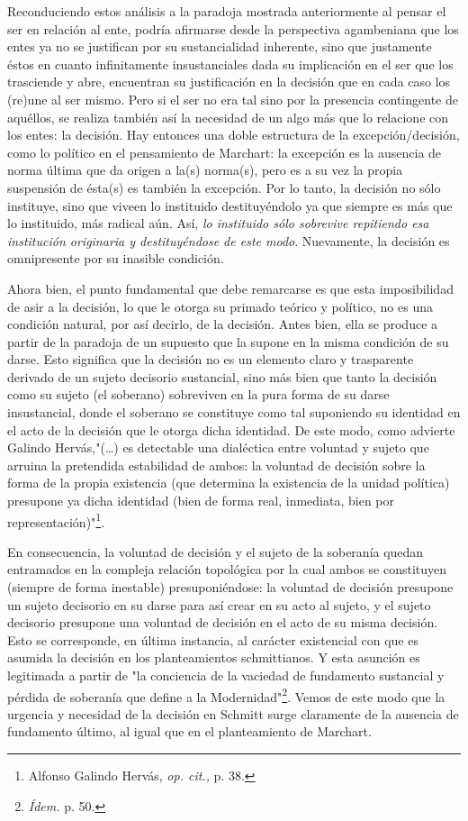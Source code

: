 \documentclass{book}
\begin{document}
Reconduciendo estos análisis a la paradoja mostrada anteriormente al
pensar el ser en relación al ente, podría afirmarse desde la perspectiva
agambeniana que los entes ya no se justifican por su sustancialidad
inherente, sino que justamente éstos en cuanto infinitamente
insustanciales dada su implicación en el ser que los trasciende y abre,
encuentran su justificación en la decisión que en cada caso los (re)une
al ser mismo. Pero si el ser no era tal sino por la presencia
contingente de aquéllos, se realiza también así la necesidad de un algo
más que lo relacione con los entes: la decisión. Hay entonces una doble
estructura de la excepción/decisión, como lo político en el pensamiento
de Marchart: la excepción es la ausencia de norma última que da origen a
la(s) norma(s), pero es a su vez la propia suspensión de ésta(s) es
también la excepción. Por lo tanto, la decisión no sólo instituye, sino
que viveen lo instituido destituyéndolo ya que siempre es más que lo
instituido, más radical aún. Así, \emph{lo instituido sólo sobrevive
repitiendo esa institución originaria y destituyéndose de este modo}.
Nuevamente, la decisión es omnipresente por su inasible condición.

Ahora bien, el punto fundamental que debe remarcarse es que esta
imposibilidad de asir a la decisión, lo que le otorga su primado teórico
y político, no es una condición natural, por así decirlo, de la
decisión. Antes bien, ella se produce a partir de la paradoja de un
supuesto que la supone en la misma condición de su darse. Esto significa
que la decisión no es un elemento claro y trasparente derivado de un
sujeto decisorio sustancial, sino más bien que tanto la decisión como su
sujeto (el soberano) sobreviven en la pura forma de su darse
insustancial, donde el soberano se constituye como tal suponiendo su
identidad en el acto de la decisión que le otorga dicha identidad. De
este modo, como advierte Galindo Hervás,"(\dots) es detectable una
dialéctica entre voluntad y sujeto que arruina la pretendida estabilidad
de ambos: la voluntad de decisión sobre la forma de la propia existencia
(que determina la existencia de la unidad política) presupone ya dicha
identidad (bien de forma real, inmediata, bien por
representación)"\footnote{Alfonso Galindo Hervás, \emph{op. cit.,} p.
  38.}.

En consecuencia, la voluntad de decisión y el sujeto de la soberanía
quedan entramados en la compleja relación topológica por la cual ambos
se constituyen (siempre de forma inestable) presuponiéndose: la voluntad
de decisión presupone un sujeto decisorio en su darse para así crear en
su acto al sujeto, y el sujeto decisorio presupone una voluntad de
decisión en el acto de su misma decisión. Esto se corresponde, en última
instancia, al carácter existencial con que es asumida la decisión en los
planteamientos schmittianos. Y esta asunción es legitimada a partir de
"la conciencia de la vaciedad de fundamento sustancial y pérdida de
soberanía que define a la Modernidad"\footnote{\emph{Ídem.} p. 50.}.
Vemos de este modo que la urgencia y necesidad de la decisión en Schmitt
surge claramente de la ausencia de fundamento último, al igual que en el
planteamiento de Marchart.
\end{document}
